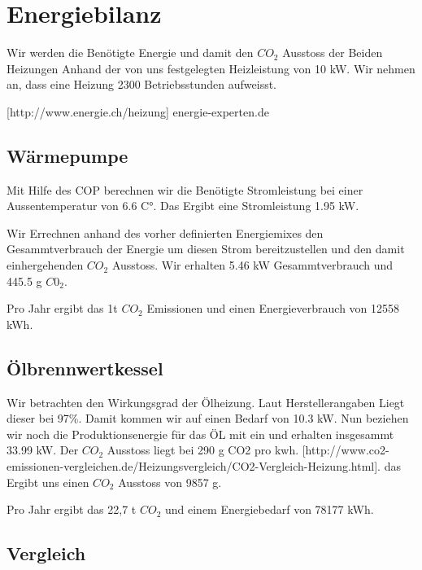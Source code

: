 \chapter{Energiebilanz}
\label{chap:bilanz}

Wir werden die Benötigte Energie und damit den $CO_2$ Ausstoss der Beiden
Heizungen Anhand der von uns festgelegten Heizleistung von 10 kW.
Wir nehmen an, dass eine Heizung 2300 Betriebsstunden aufweisst.

[http://www.energie.ch/heizung]
energie-experten.de

\section{Wärmepumpe}

Mit Hilfe des COP berechnen wir die Benötigte Stromleistung bei einer
Aussentemperatur von 6.6 C°.
Das Ergibt eine Stromleistung 1.95 kW.

Wir Errechnen anhand des vorher definierten Energiemixes den Gesammtverbrauch
der Energie um diesen Strom bereitzustellen und den damit einhergehenden $CO_2$
Ausstoss.
Wir erhalten 5.46 kW Gesammtverbrauch und 445.5 g $C0_2$.

Pro Jahr ergibt das 1t $CO_2$ Emissionen und einen Energieverbrauch von 12558 kWh.

\section{Ölbrennwertkessel}

Wir betrachten den Wirkungsgrad der Ölheizung.
Laut Herstellerangaben Liegt dieser bei 97\%.
Damit kommen wir auf einen Bedarf von 10.3 kW.
Nun beziehen wir noch die Produktionsenergie für das ÖL mit ein und erhalten
insgesammt 33.99 kW.
Der $CO_2$ Ausstoss liegt bei 290 g CO2 pro kwh.
[http://www.co2-emissionen-vergleichen.de/Heizungsvergleich/CO2-Vergleich-Heizung.html].
das Ergibt uns einen $CO_2$ Ausstoss von 9857 g.

Pro Jahr ergibt das 22,7 t $CO_2$ und einem Energiebedarf von 78177 kWh.


\section{Vergleich}


